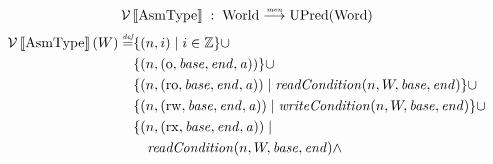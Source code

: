 \documentclass{article}
\newcommand{\update}[2]{[#1 \mapsto #2]}
\newcommand{\sem}[1]{\left\llbracket #1 \right\rrbracket}
\newcommand{\monfun}{\stackrel{\textit{\tiny{mon}}}{\longrightarrow}}
\newcommand{\defeq}{\stackrel{\textit{\tiny{def}}}{=}}
\newcommand{\union}{\mathbin{\cup}}
\DeclareMathOperator{\dom}{dom}
\newcommand{\var}[1]{\mathit{#1}}
\newcommand{\addr}{\var{a}}
\newcommand{\start}{\var{base}}
\newcommand{\addrend}{\var{end}}
\newcommand{\heapseg}{\var{hs}}
\newcommand{\heap}{\var{heap}}
\newcommand{\perm}{\var{perm}}
\newcommand{\stdcap}[1][\perm]{\left(#1,\start,\addrend,\addr \right)}
\newcommand{\plainproj}[1]{\mathrm{#1}}
\newcommand{\memheap}[1][\Phi]{#1.\plainproj{heap}}
\newcommand{\plainfun}[1]{\mathit{#1}}
\newcommand{\readCond}[1]{\plainfun{readCondition}(#1)}
\newcommand{\writeCond}[1]{\plainfun{writeCondition}(#1)}
\newcommand{\future}{\mathbin{\sqsupseteq}}
\newcommand{\heapSat}[3][\heap]{#1 :_{#2} #3}
\newcommand{\asmType}{\plaindom{AsmType}}
\newcommand{\plaindom}[1]{\mathrm{#1}}
\newcommand{\Words}{\plaindom{Word}}
\newcommand{\ints}{\mathbb{Z}}
\newcommand{\RegionName}{\plaindom{RegionName}}
\newcommand{\Worlds}{\plaindom{World}}
\newcommand{\UPred}[1]{\plaindom{UPred}(#1)}
\newcommand{\intr}[2]{\mathcal{#1}\sem{#2}}
\newcommand{\valueintr}[1]{\intr{V}{#1}}
\newcommand{\stdvr}{\valueintr{\asmType}}
\newcommand{\npair}[2][n]{\left(#1,#2 \right)}
\newcommand{\plainperm}[1]{\mathrm{#1}}
\newcommand{\noperm}{\plainperm{o}}
\newcommand{\readonly}{\plainperm{ro}}
\newcommand{\readwrite}{\plainperm{rw}}
\newcommand{\exec}{\plainperm{rx}}
\begin{document}
\[
\stdvr \; : \;  \Worlds \monfun \UPred{\Words}
\]
\begin{align*}
  \stdvr(W) \defeq & \{ \npair{i} \mid i \in \ints \} 
\union \\
                   & \{ \npair{\stdcap[\noperm] }  \} 
\union \\
                   & \{ \npair{\stdcap[\readonly] } \mid \readCond{n,W,\start,\addrend} \} \union \\
                   & \{ \npair{\stdcap[\readwrite] } \mid \writeCond{n,W,\start,\addrend} \} \union \\
                   & \{ \npair{\stdcap[\exec]} \mid \\
                   & \quad\readCond{n,W,\start,\addrend} \land \\

\end{align*}
\end{document}

